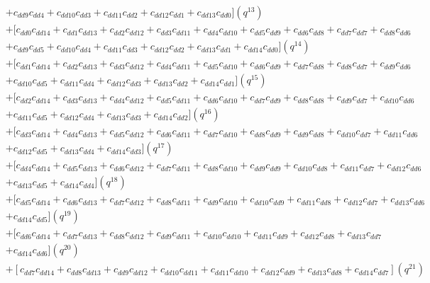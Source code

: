 \documentclass[12pt]{article}
\begin{document}
\begin{align}
    &+ c_{dd9}c_{dd4} + c_{dd10}c_{dd3} + c_{dd11}c_{dd2} + c_{dd12}c_{dd1} + c_{dd13}c_{dd0}](q^{13}) \nonumber\\
    &+ [c_{dd0}c_{dd14} + c_{dd1}c_{dd13} + c_{dd2}c_{dd12} + c_{dd3}c_{dd11} + c_{dd4}c_{dd10} + c_{dd5}c_{dd9} + c_{dd6}c_{dd8} + c_{dd7}c_{dd7} + c_{dd8}c_{dd6} \nonumber\\
    &+ c_{dd9}c_{dd5} + c_{dd10}c_{dd4} + c_{dd11}c_{dd3} + c_{dd12}c_{dd2} + c_{dd13}c_{dd1} + c_{dd14}c_{dd0}](q^{14}) \nonumber\\
    &+ [c_{dd1}c_{dd14} + c_{dd2}c_{dd13} + c_{dd3}c_{dd12} + c_{dd4}c_{dd11} + c_{dd5}c_{dd10} + c_{dd6}c_{dd9} + c_{dd7}c_{dd8} + c_{dd8}c_{dd7} + c_{dd9}c_{dd6} \nonumber\\
    &+ c_{dd10}c_{dd5} + c_{dd11}c_{dd4} + c_{dd12}c_{dd3} + c_{dd13}c_{dd2} + c_{dd14}c_{dd1}](q^{15}) \nonumber\\
    &+ [c_{dd2}c_{dd14} + c_{dd3}c_{dd13} + c_{dd4}c_{dd12} + c_{dd5}c_{dd11} + c_{dd6}c_{dd10} + c_{dd7}c_{dd9} + c_{dd8}c_{dd8} + c_{dd9}c_{dd7} + c_{dd10}c_{dd6} \nonumber\\
    &+ c_{dd11}c_{dd5} + c_{dd12}c_{dd4} + c_{dd13}c_{dd3} + c_{dd14}c_{dd2}](q^{16}) \nonumber\\
    &+ [c_{dd3}c_{dd14} + c_{dd4}c_{dd13} + c_{dd5}c_{dd12} + c_{dd6}c_{dd11} + c_{dd7}c_{dd10} + c_{dd8}c_{dd9} + c_{dd9}c_{dd8} + c_{dd10}c_{dd7} + c_{dd11}c_{dd6} \nonumber\\
    &+ c_{dd12}c_{dd5} + c_{dd13}c_{dd4} + c_{dd14}c_{dd3}](q^{17}) \nonumber\\
    &+ [c_{dd4}c_{dd14} + c_{dd5}c_{dd13} + c_{dd6}c_{dd12} + c_{dd7}c_{dd11} + c_{dd8}c_{dd10} + c_{dd9}c_{dd9} + c_{dd10}c_{dd8} + c_{dd11}c_{dd7} + c_{dd12}c_{dd6} \nonumber\\
    &+ c_{dd13}c_{dd5} + c_{dd14}c_{dd4}](q^{18}) \nonumber\\
    &+ [c_{dd5}c_{dd14} + c_{dd6}c_{dd13} + c_{dd7}c_{dd12} + c_{dd8}c_{dd11} + c_{dd9}c_{dd10} + c_{dd10}c_{dd9} + c_{dd11}c_{dd8} + c_{dd12}c_{dd7} + c_{dd13}c_{dd6} \nonumber\\
    &+ c_{dd14}c_{dd5}](q^{19}) \nonumber\\
    &+ [c_{dd6}c_{dd14} + c_{dd7}c_{dd13} + c_{dd8}c_{dd12} + c_{dd9}c_{dd11} + c_{dd10}c_{dd10} + c_{dd11}c_{dd9} + c_{dd12}c_{dd8} + c_{dd13}c_{dd7} \nonumber\\
    &+ c_{dd14}c_{dd6}](q^{20}) \nonumber\\
    &+ [c_{dd7}c_{dd14} + c_{dd8}c_{dd13} + c_{dd9}c_{dd12} + c_{dd10}c_{dd11} + c_{dd11}c_{dd10} + c_{dd12}c_{dd9} + c_{dd13}c_{dd8} + c_{dd14}c_{dd7}](q^{21}) \nonumber\\

\end{align}
\end{document}
